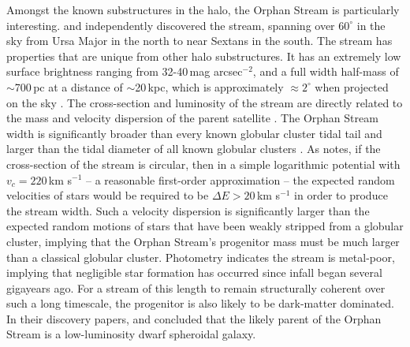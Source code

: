 \documentclass{emulateapj}
\begin{document}
Amongst the known substructures in the halo, the Orphan Stream is particularly interesting. \citet{grillmair_2006} and \citet{Belokurov;et-al_2006} independently discovered the stream, spanning over $60^\circ$ in the sky from Ursa Major in the north to near Sextans in the south. The stream has properties that are unique from other halo substructures. It has an extremely low surface brightness ranging from 32-40\,mag arcsec$^{-2}$, and a full width half-mass of $\sim$700\,pc at a distance of $\sim$20\,kpc, which is approximately $\approx2^\circ$ when projected on the sky \citep{belokurov;et-al_2007,grillmair_2006}. The cross-section and luminosity of the stream are directly related to the mass and velocity dispersion of the parent satellite \citep{johnston_1998}. The Orphan Stream width is significantly broader than every known globular cluster tidal tail \citep{odenkirchen;et-al_2003,grillmair_johnson_2006,grillmair_dionatos_2006a,grillmair_dionatos_2006b} and larger than the tidal diameter of all known globular clusters \citep{harris}. As \citet{grillmair_2006} notes, if the cross-section of the stream is circular, then in a simple logarithmic potential with $v_c = 220$\,km s$^{-1}$ -- a reasonable first-order approximation -- the expected random velocities of stars would be required to be $\Delta{E} > 20$\,km s$^{-1}$ in order to produce the stream width. Such a velocity dispersion is significantly larger than the expected random motions of stars that have been weakly stripped from a globular cluster, implying that the Orphan Stream's progenitor mass must be much larger than a classical globular cluster. Photometry indicates the stream is metal-poor, implying that negligible star formation has occurred since infall began several gigayears ago. For a stream of this length to remain structurally coherent over such a long timescale, the progenitor is also likely to be dark-matter dominated. In their discovery papers, \citet{grillmair_2006} and \citet{belokurov;et-al_2007} concluded that the likely parent of the Orphan Stream is a low-luminosity dwarf spheroidal galaxy.

 
\end{document}
